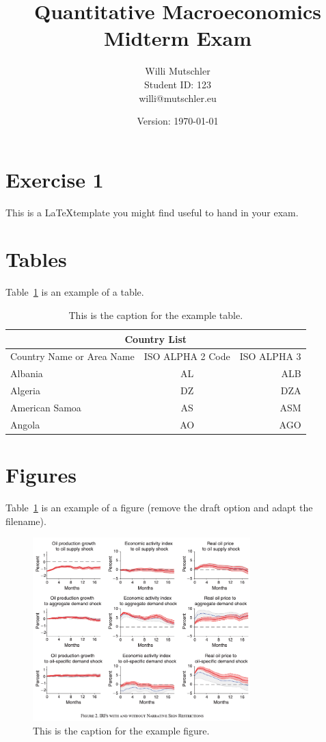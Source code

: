 \documentclass[a4paper]{scrartcl}
\begin{document}
\title{Quantitative Macroeconomics\\Midterm Exam}
\author{Willi Mutschler\\Student ID: 123\\willi@mutschler.eu}
\date{Version: \today}
\maketitle\thispagestyle{empty}

\newpage
\tableofcontents\thispagestyle{empty}\newpage \setcounter{page}{1}

\section{Exercise 1}\label{sec:introduction}
This is a \LaTeX template you might find useful to hand in your exam.

\section{Tables}
Table~\ref{tbl:1} is an example of a table.
\begin{table}[h!]
\centering
\begin{tabular}{lcr}
\multicolumn{3}{|c|}{Country List} \\
\toprule
Country Name or Area Name& ISO ALPHA 2 Code &ISO ALPHA 3
\\
\midrule
Albania &AL & ALB
\\
Algeria &DZ & DZA
\\
American Samoa & AS & ASM
\\
Angola & AO & AGO
\\
\bottomrule
\end{tabular}
\caption{This is the caption for the example table.\label{tbl:1}}
\end{table}

\section{Figures}
Table~\ref{fig:1} is an example of a figure (remove the draft option and adapt the filename).
\begin{figure}[t!]\centering
\includegraphics[draft,width=0.75\textwidth]{../../plots/NarrativeSignRestrictionsIRFs.png}
\caption{This is the caption for the example figure.\label{fig:1}}
\end{figure}
\end{document}
